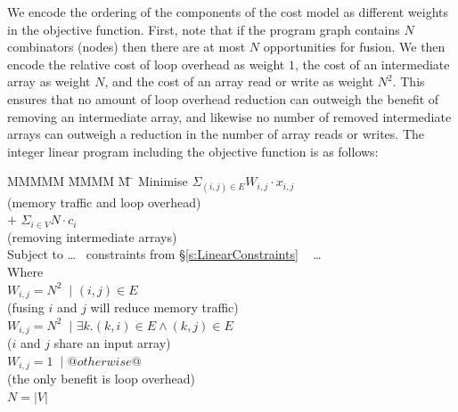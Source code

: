 We encode the ordering of the components of the cost model as different weights in the objective function. First, note that if the program graph contains $N$ combinators (nodes) then there are at most $N$ opportunities for fusion. We then encode the relative cost of loop overhead as weight $1$, the cost of an intermediate array as weight $N$, and the cost of an array read or write as weight $N^2$. This ensures that no amount of loop overhead reduction can outweigh the benefit of removing an intermediate array, and likewise no number of removed intermediate arrays can outweigh a reduction in the number of array reads or writes. The integer linear program including the objective function is as follows:
\begin{tabbing}
MMMMM   \= MMMM \= M \= \kill
Minimise   \>     \> $\Sigma_{(i,j) \in E} W_{i,j} \cdot x_{i,j}$   
\\         \> \> \> (memory traffic and loop overhead)              
\\         \> $+$ \> $\Sigma_{i \in V} N \cdot c_i$                  
\\         \> \> \> (removing intermediate arrays)         
\\ Subject to \> \ldots ~ constraints from \S\ref{s:LinearConstraints} ~ \ldots 
\\ Where      \>                                       
\\         \> $W_{i,j} = N^2$ \> $~|$ \> $(i,j) \in E $         
\\         \> \> \> (fusing $i$ and $j$ will reduce memory traffic)         
\\         \> $W_{i,j} = N^2$ \> $~|$ \> $\exists k. (k,i) \in E \wedge (k,j) \in E $     
\\         \> \> \> ($i$ and $j$ share an input array)
\\         \> $W_{i,j} = 1$   \> $~|$ \> $@otherwise@$
\\         \> \> \> (the only benefit is loop overhead)
\\         \> $N = |V|$
\end{tabbing}




